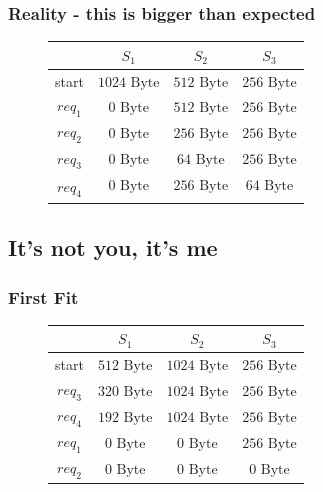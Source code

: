 \documentclass[a4paper, 11pt]{article}
\begin{document}
    \subsubsection{Reality - this is bigger than expected}
    \begin{figure}[h]
      \centering
      \begin{tabular}{|c|c|c|c|}
        \hline
        &$S_1$&$S_2$&$S_3$\\\hline
        start&$1024 \mbox{ Byte}$&$512 \mbox{ Byte}$&$256 \mbox{ Byte}$\\
        $req_1$&$0 \mbox{ Byte}$&$512 \mbox{ Byte}$&$256 \mbox{ Byte}$\\
        $req_2$&$0 \mbox{ Byte}$&$256 \mbox{ Byte}$&$256 \mbox{ Byte}$\\
        $req_3$&$0 \mbox{ Byte}$&$64 \mbox{ Byte}$&$256 \mbox{ Byte}$\\\hline\hline
        \multirow{2}{*}{$req_4$}&$0 \mbox{ Byte}$&$256 \mbox{ Byte}$&$64 \mbox{ Byte}$\\ \cline{2-4}&\multicolumn{3}{c|}{\color{red}{Cannot fit anywhere}}\\
        \hline
  
      \end{tabular}
\end{figure}

\subsection{It's not you, it's me}
\subsubsection{First Fit}
\begin{figure}[h]
      \centering
      \begin{tabular}{|c|c|c|c|}
        \hline
        &$S_1$&$S_2$&$S_3$\\\hline
        start&$512 \mbox{ Byte}$&$1024 \mbox{ Byte}$&$256 \mbox{ Byte}$\\
        $req_3$&$320 \mbox{ Byte}$&$1024 \mbox{ Byte}$&$256 \mbox{ Byte}$\\
        $req_4$&$192 \mbox{ Byte}$&$1024 \mbox{ Byte}$&$256 \mbox{ Byte}$\\
        $req_1$&$0 \mbox{ Byte}$&$0 \mbox{ Byte}$&$256 \mbox{ Byte}$\\
        $req_2$&$0 \mbox{ Byte}$&$0 \mbox{ Byte}$&$0 \mbox{ Byte}$\\\hline
  
      \end{tabular}
\end{figure}
\end{document}
